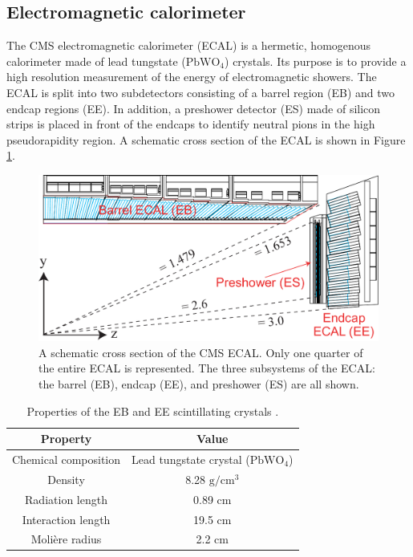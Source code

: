 \subsection{Electromagnetic calorimeter}
\label{sec:ecal}

The CMS electromagnetic calorimeter (ECAL)
is a hermetic, homogenous calorimeter made of 
lead tungstate ($\text{PbWO}_4$) crystals.  
Its purpose is to provide a high resolution measurement 
of the energy of electromagnetic showers.
The ECAL 
is split into two subdetectors consisting of a barrel 
region (EB)
and two endcap regions (EE).
In addition, a preshower detector (ES) 
made of silicon strips is placed in front of the endcaps to identify
neutral pions in the high pseudorapidity region.
A schematic cross section of the ECAL is shown in Figure \ref{fig:ecal}.

\begin{figure}
  \centering
  \includegraphics[width=1.0\textwidth]{tex/cms/fig/ecal-schematic-2.pdf}
  \caption{A schematic cross section of the CMS ECAL.  Only one quarter of the entire
    ECAL is represented. The three subsystems of the ECAL: the barrel (EB), endcap (EE),
    and preshower (ES) are all shown. \cite{cms-tdr}}
  \label{fig:ecal}
\end{figure}


\begin{table}
  \centering
  \begin{tabular}{c|c}
    Property & Value \\
    \hline\hline
    Chemical composition & Lead tungstate crystal ($\text{PbWO}_4$) \\
    Density & 8.28 $\text{g}/\text{cm}^{3}$ \\
    Radiation length & 0.89 cm \\
    Interaction length & 19.5 cm \\
    Moli\`{e}re radius & 2.2 cm \\
  \end{tabular}
  \caption{Properties of the EB and EE scintillating crystals \cite{cms-jinst}.}
  \label{tab:ecal-crystal}
\end{table}

